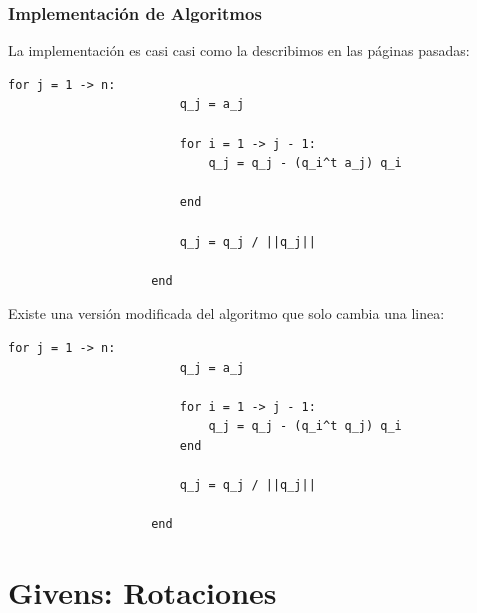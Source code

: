 \documentclass[12pt, fleqn]{report}                             %
\theoremstyle{break}                                            %
\begin{document}
                
                
            \clearpage
            \subsection{Implementación de Algoritmos}

                La implementación es casi casi como la describimos en las páginas pasadas:
                \begin{lstlisting}[gobble=16]
                    for j = 1 -> n:
                        q_j = a_j
    
                        for i = 1 -> j - 1:
                            q_j = q_j - (q_i^t a_j) q_i

                        end

                        q_j = q_j / ||q_j||

                    end

                \end{lstlisting}

                Existe una versión modificada del algoritmo que solo cambia una linea:
                \begin{lstlisting}[gobble=16]
                    for j = 1 -> n:
                        q_j = a_j
    
                        for i = 1 -> j - 1:
                            q_j = q_j - (q_i^t q_j) q_i
                        end

                        q_j = q_j / ||q_j||

                    end

                \end{lstlisting}




    \chapter{Givens: Rotaciones}
  
        \clearpage
\end{document}
